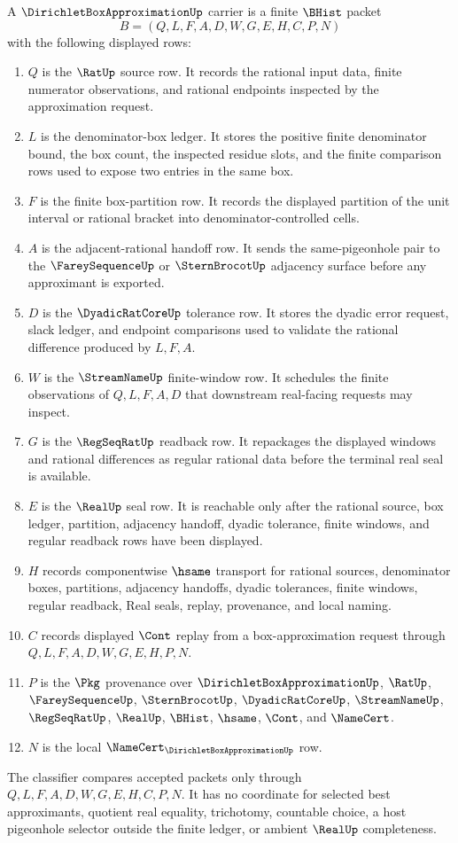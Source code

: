 \begin{definition}
\label{def:dirichlet-box-approximation-carrier}
A $\DirichletBoxApproximationUp$ carrier is a finite $\BHist$ packet
$$
B=(Q,L,F,A,D,W,G,E,H,C,P,N)
$$
with the following displayed rows:
\begin{enumerate}
\item $Q$ is the $\RatUp$ source row. It records the rational input data, finite numerator observations, and rational endpoints inspected by the approximation request.
\item $L$ is the denominator-box ledger. It stores the positive finite denominator bound, the box count, the inspected residue slots, and the finite comparison rows used to expose two entries in the same box.
\item $F$ is the finite box-partition row. It records the displayed partition of the unit interval or rational bracket into denominator-controlled cells.
\item $A$ is the adjacent-rational handoff row. It sends the same-pigeonhole pair to the $\FareySequenceUp$ or $\SternBrocotUp$ adjacency surface before any approximant is exported.
\item $D$ is the $\DyadicRatCoreUp$ tolerance row. It stores the dyadic error request, slack ledger, and endpoint comparisons used to validate the rational difference produced by $L,F,A$.
\item $W$ is the $\StreamNameUp$ finite-window row. It schedules the finite observations of $Q,L,F,A,D$ that downstream real-facing requests may inspect.
\item $G$ is the $\RegSeqRatUp$ readback row. It repackages the displayed windows and rational differences as regular rational data before the terminal real seal is available.
\item $E$ is the $\RealUp$ seal row. It is reachable only after the rational source, box ledger, partition, adjacency handoff, dyadic tolerance, finite windows, and regular readback rows have been displayed.
\item $H$ records componentwise $\hsame$ transport for rational sources, denominator boxes, partitions, adjacency handoffs, dyadic tolerances, finite windows, regular readback, Real seals, replay, provenance, and local naming.
\item $C$ records displayed $\Cont$ replay from a box-approximation request through $Q,L,F,A,D,W,G,E,H,P,N$.
\item $P$ is the $\Pkg$ provenance over $\DirichletBoxApproximationUp$, $\RatUp$, $\FareySequenceUp$, $\SternBrocotUp$, $\DyadicRatCoreUp$, $\StreamNameUp$, $\RegSeqRatUp$, $\RealUp$, $\BHist$, $\hsame$, $\Cont$, and $\NameCert$.
\item $N$ is the local $\NameCert_{\DirichletBoxApproximationUp}$ row.
\end{enumerate}
The classifier compares accepted packets only through $Q,L,F,A,D,W,G,E,H,C,P,N$. It has no coordinate for selected best approximants, quotient real equality, trichotomy, countable choice, a host pigeonhole selector outside the finite ledger, or ambient $\RealUp$ completeness.
\end{definition}
